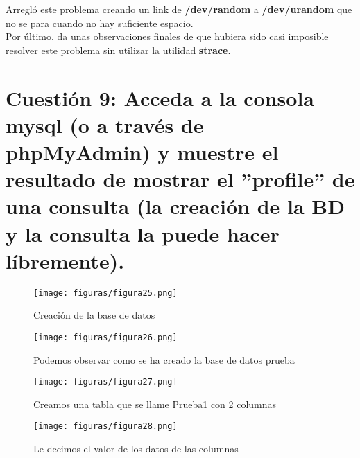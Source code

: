 Arregló este problema creando un link de \textbf{/dev/random} a  \textbf{/dev/urandom} que no se para cuando no hay suficiente espacio.\\

Por último, da unas observaciones finales de que hubiera sido casi imposible resolver este problema sin utilizar la utilidad \textbf{strace}.


\section{Cuestión 9: Acceda a la consola mysql (o a través de phpMyAdmin) y muestre el resultado de mostrar el ”profile” de una consulta (la creación de la BD y la consulta la puede hacer líbremente).}
\begin{figure}[H] %
	\centering
	\texttt{[image: figuras/figura25.png]}  %
	\label{figura25}
	
	\caption{Creación de la base de datos} 
\end{figure}

\begin{figure}[H] %
	\centering
	\texttt{[image: figuras/figura26.png]}  %
	\label{figura26}
	
	\caption{Podemos observar como se ha creado la base de datos prueba} 
\end{figure}

\begin{figure}[H] %
	\centering
	\texttt{[image: figuras/figura27.png]}  %
	\label{figura27}
	
	\caption{Creamos una tabla que se llame Prueba1 con 2 columnas} 
\end{figure}

\begin{figure}[H] %
	\centering
	\texttt{[image: figuras/figura28.png]}  %
	\label{figura28}
	
	\caption{Le decimos el valor de los datos de las columnas} 
\end{figure}

